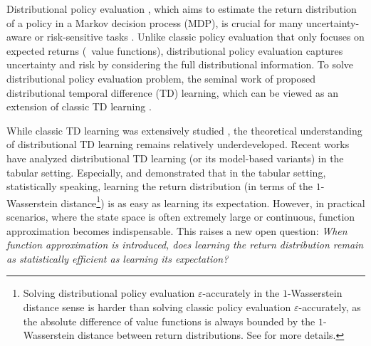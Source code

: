 Distributional policy evaluation
\citep{morimura2010nonparametric,bellemare2017distributional,bdr2022}, which aims to estimate the return distribution of a policy in a Markov decision process (MDP), is crucial for many uncertainty-aware or risk-sensitive tasks \citep{lim2022distributional,kastner2023distributional}.
Unlike classic policy evaluation that only focuses on expected returns (\ie\ value functions), distributional policy evaluation captures uncertainty and risk by considering the full distributional information.
To solve distributional policy evaluation problem, the seminal work of \cite{bellemare2017distributional} proposed distributional temporal difference (TD) learning, which can be viewed as an extension of classic TD learning \citep{sutton1988learning}.

While classic TD learning was extensively studied \citep{bertsekas1995neuro, tsitsiklis1996analysis, bhandari2018finite, dalal2018finite, patil2023finite,li2024q,li2024high, chen2024lyapunov,samsonov2024gaussian,samsonov2024improved, wu2024statistical}, the theoretical understanding of distributional TD learning remains relatively underdeveloped.
Recent works \cite{rowland2018analysis,speedy,zhang2023estimation,rowland2024analysis,rowland2024nearminimaxoptimal,peng2024statistical} have analyzed distributional TD learning (or its model-based variants) in the tabular setting.
Especially, \cite{rowland2024nearminimaxoptimal} and \cite{peng2024statistical} demonstrated that in the tabular setting, statistically speaking, learning the return distribution (in terms of the $1$-Wasserstein distance\footnote{Solving distributional policy evaluation $\varepsilon$-accurately in the $1$-Wasserstein
distance sense is harder than solving classic policy evaluation $\varepsilon$-accurately, as the absolute difference of value functions is always bounded by the $1$-Wasserstein distance between return distributions. See \citep[Appendix~B][]{peng2024statistical} for more details.}) is as easy as learning its expectation.
However, in practical scenarios, where the state space is often extremely large or continuous, function approximation \citep{bellemare2017distributional,dabney2018distributional,dabney2018implicit,yang2019fully,freirich2019distributional,yue2020implicit,nguyen2021distributional,ijcai2021p476,luo2022distributional,wenliang2024distributional,sun2024distributional} becomes indispensable.
This raises a new open question: \emph{When function approximation is introduced, does learning the return distribution remain as statistically efficient as learning its expectation?}

